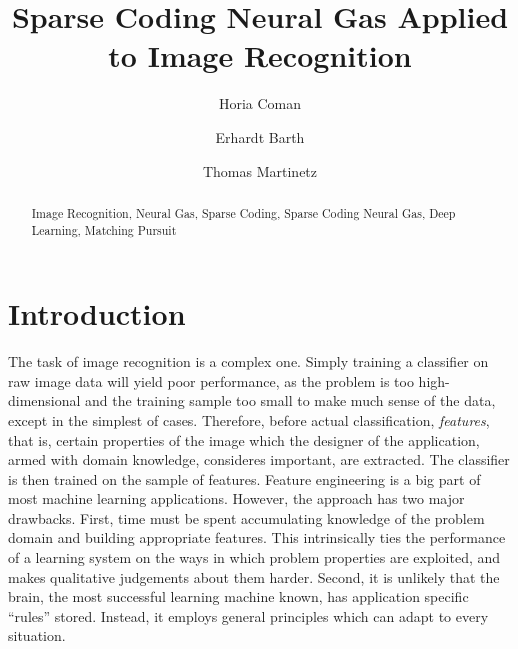 \documentclass[runningheads,a4paper]{llncs}
\newcommand{\keywords}[1]{\par\addvspace\baselineskip
\noindent\keywordname\enspace\ignorespaces#1}
\begin{document}
\mainmatter

\title{Sparse Coding Neural Gas Applied to Image Recognition}

\author{Horia Coman \and Erhardt Barth \and Thomas Martinetz}


\maketitle

\begin{abstract}
\keywords{Image Recognition, Neural Gas, Sparse Coding, Sparse Coding Neural Gas, Deep Learning, Matching Pursuit}
\end{abstract}

\section{Introduction}

The task of image recognition is a complex one. Simply training a classifier on raw image data will yield poor performance, as the problem is too high-dimensional and the training sample too small to make much sense of the data, except in the simplest of cases. Therefore, before actual classification, \emph{features}, that is, certain properties of the image which the designer of the application, armed with domain knowledge, consideres important, are extracted. The classifier is then trained on the sample of features. Feature engineering is a big part of most machine learning applications. However, the approach has two major drawbacks. First, time must be spent accumulating knowledge of the problem domain and building appropriate features. This intrinsically ties the performance of a learning system on the ways in which problem properties are exploited, and makes qualitative judgements about them harder. Second, it is unlikely that the brain, the most successful learning machine known, has application specific ``rules'' stored. Instead, it employs general principles which can adapt to every situation. 
\end{document}
